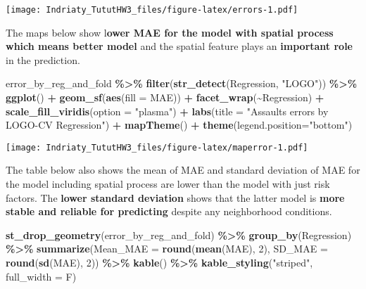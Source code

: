 \documentclass[
]{article}
\newenvironment{Shaded}{\begin{snugshade}}{\end{snugshade}}
\newcommand{\AttributeTok}[1]{\textcolor[rgb]{0.13,0.29,0.53}{#1}}
\newcommand{\DecValTok}[1]{\textcolor[rgb]{0.00,0.00,0.81}{#1}}
\newcommand{\FunctionTok}[1]{\textcolor[rgb]{0.13,0.29,0.53}{\textbf{#1}}}
\newcommand{\NormalTok}[1]{#1}
\newcommand{\SpecialCharTok}[1]{\textcolor[rgb]{0.81,0.36,0.00}{\textbf{#1}}}
\newcommand{\StringTok}[1]{\textcolor[rgb]{0.31,0.60,0.02}{#1}}
\begin{document}
\texttt{[image: Indriaty\_TututHW3\_files/figure-latex/errors-1.pdf]}

The maps below show l\textbf{ower MAE for the model with spatial process
which means better model} and the spatial feature plays an
\textbf{important role} in the prediction.

\begin{Shaded}
\begin{Highlighting}[]
\NormalTok{error\_by\_reg\_and\_fold }\SpecialCharTok{\%\textgreater{}\%}
  \FunctionTok{filter}\NormalTok{(}\FunctionTok{str\_detect}\NormalTok{(Regression, }\StringTok{"LOGO"}\NormalTok{)) }\SpecialCharTok{\%\textgreater{}\%}
  \FunctionTok{ggplot}\NormalTok{() }\SpecialCharTok{+}
    \FunctionTok{geom\_sf}\NormalTok{(}\FunctionTok{aes}\NormalTok{(}\AttributeTok{fill =}\NormalTok{ MAE)) }\SpecialCharTok{+}
    \FunctionTok{facet\_wrap}\NormalTok{(}\SpecialCharTok{\textasciitilde{}}\NormalTok{Regression) }\SpecialCharTok{+}
    \FunctionTok{scale\_fill\_viridis}\NormalTok{(}\AttributeTok{option =} \StringTok{"plasma"}\NormalTok{) }\SpecialCharTok{+}
    \FunctionTok{labs}\NormalTok{(}\AttributeTok{title =} \StringTok{"Assaults errors by LOGO{-}CV Regression"}\NormalTok{) }\SpecialCharTok{+}
    \FunctionTok{mapTheme}\NormalTok{() }\SpecialCharTok{+} \FunctionTok{theme}\NormalTok{(}\AttributeTok{legend.position=}\StringTok{"bottom"}\NormalTok{)}
\end{Highlighting}
\end{Shaded}

\texttt{[image: Indriaty\_TututHW3\_files/figure-latex/maperror-1.pdf]}

The table below also shows the mean of MAE and standard deviation of MAE
for the model including spatial process are lower than the model with
just risk factors. The \textbf{lower standard deviation} shows that the
latter model is \textbf{more stable and reliable for predicting} despite
any neighborhood conditions.

\begin{Shaded}
\begin{Highlighting}[]
\FunctionTok{st\_drop\_geometry}\NormalTok{(error\_by\_reg\_and\_fold) }\SpecialCharTok{\%\textgreater{}\%}
  \FunctionTok{group\_by}\NormalTok{(Regression) }\SpecialCharTok{\%\textgreater{}\%} 
    \FunctionTok{summarize}\NormalTok{(}\AttributeTok{Mean\_MAE =} \FunctionTok{round}\NormalTok{(}\FunctionTok{mean}\NormalTok{(MAE), }\DecValTok{2}\NormalTok{),}
              \AttributeTok{SD\_MAE =} \FunctionTok{round}\NormalTok{(}\FunctionTok{sd}\NormalTok{(MAE), }\DecValTok{2}\NormalTok{)) }\SpecialCharTok{\%\textgreater{}\%}
  \FunctionTok{kable}\NormalTok{() }\SpecialCharTok{\%\textgreater{}\%}
    \FunctionTok{kable\_styling}\NormalTok{(}\StringTok{"striped"}\NormalTok{, }\AttributeTok{full\_width =}\NormalTok{ F)}
\end{Highlighting}
\end{Shaded}
\end{document}
